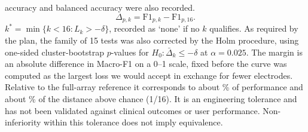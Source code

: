 \subsection[Hypothesis testing and statistical analysis]{}
\label{sec:statistics}

 accuracy and balanced accuracy were also recorded. 
\begin{equation}
\Delta_{p,k} = \mathrm{F1}_{p,k} - \mathrm{F1}_{p,16}.
\end{equation}
 $k^* = \min\{k < 16 : L_k > -\delta\}$, recorded as `none' if no $k$ qualifies. As required by the plan, the family of 15 tests was also corrected by the Holm procedure, using one-sided cluster-bootstrap $p$-values for $H_0\colon \bar\Delta_k \le -\delta$ at $\alpha = 0.025$. The margin is an absolute difference in Macro-F1 on a 0--1 scale, fixed before the curve was computed as the largest loss we would accept in exchange for fewer electrodes. Relative to the full-array reference it corresponds to about \MarginPctOfRef\% of performance and about \MarginPctAboveChance\% of the distance above chance (1/16). It is an engineering tolerance and has not been validated against clinical outcomes or user performance.  Non-inferiority within this tolerance does not imply equivalence.

